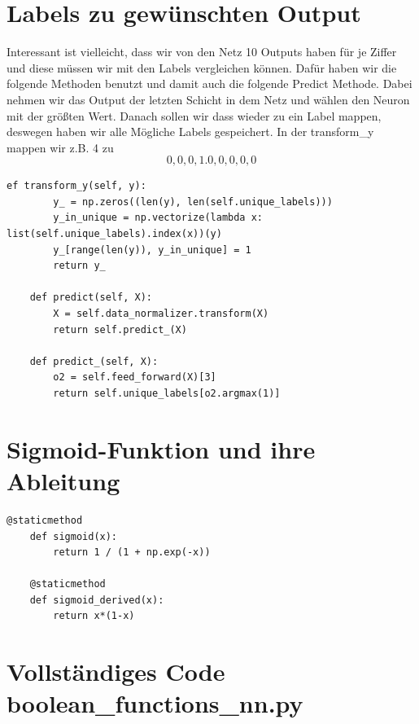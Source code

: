 \section*{Labels zu gewünschten Output}
Interessant ist vielleicht, dass wir von den Netz 10 Outputs haben für je Ziffer und diese müssen wir mit den
Labels vergleichen können. Dafür haben wir die folgende Methoden benutzt und damit auch die folgende Predict Methode.
Dabei nehmen wir das Output der letzten Schicht in dem Netz und wählen den Neuron mit der größten Wert. Danach
sollen wir dass wieder zu ein Label mappen, deswegen haben wir alle Mögliche Labels gespeichert.
In der transform\_y mappen wir z.B. 4 zu \[0,0,0,1.0,0,0,0,0\]

\begin{lstlisting}[style=py]
ef transform_y(self, y):
        y_ = np.zeros((len(y), len(self.unique_labels)))
        y_in_unique = np.vectorize(lambda x: list(self.unique_labels).index(x))(y)
        y_[range(len(y)), y_in_unique] = 1
        return y_

    def predict(self, X):
        X = self.data_normalizer.transform(X)
        return self.predict_(X)

    def predict_(self, X):
        o2 = self.feed_forward(X)[3]
        return self.unique_labels[o2.argmax(1)]
\end{lstlisting}


\section*{Sigmoid-Funktion und ihre Ableitung}

\begin{lstlisting}[style=py]
@staticmethod
    def sigmoid(x):
        return 1 / (1 + np.exp(-x))

    @staticmethod
    def sigmoid_derived(x):
        return x*(1-x)
\end{lstlisting}

\section*{Vollständiges Code boolean\_functions\_nn.py}

